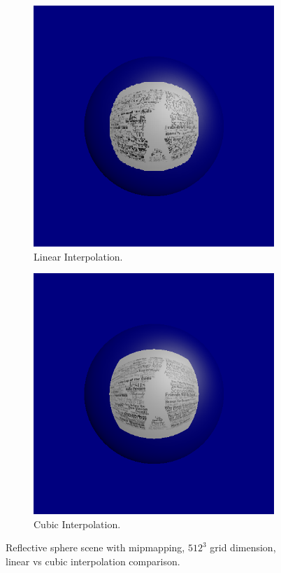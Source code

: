 \documentclass[12pt]{article}
\newcommand{\testhighres}{512}
\begin{document}
\begin{figure}[H]
	\centering
	\begin{subfigure}[b]{0.49\linewidth}
		\includegraphics[width=\linewidth]{images/spere_mirror_high_lod_linear}
		\caption{Linear Interpolation.}
	\end{subfigure}
	\begin{subfigure}[b]{0.49\linewidth}
		\includegraphics[width=\linewidth]{images/spere_mirror_high_lod_cubic}
		\caption{Cubic Interpolation.}
	\end{subfigure}
	\caption{Reflective sphere scene with mipmapping, $\testhighres^3$ grid dimension, linear vs cubic interpolation comparison.}
	\label{fig:testlowinterpolation}
\end{figure}
\end{document}
